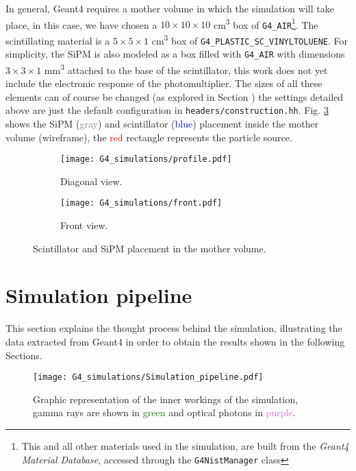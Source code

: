 In general, Geant4 requires a mother volume in which the simulation will take place, in this case, we have chosen a $10\times10\times10$ \unit{\cm\cubed} box of \texttt{G4\_AIR}\footnote{This and all other materials used in the simulation, are built from the \textit{Geant4 Material Database}, accessed through the \texttt{G4NistManager} class}. The scintillating material is a $5\times5\times1$ \unit{\cm\cubed} box of \texttt{G4\_PLASTIC\_SC\_VINYLTOLUENE}. For simplicity, the SiPM is also modeled as a box filled with \texttt{G4\_AIR} with dimensions $3\times3\times1$ \unit{\mm\cubed} attached to the base of the scintillator, this work does not yet include the electronic response of the photomultiplier. The sizes of all these elements can of course be changed (as explored in Section ) the settings detailed above are just the default configuration in \texttt{headers/construction.hh}. Fig. \ref{fig:geometry} shows the SiPM (\textcolor{Gray}{gray}) and scintillator (\textcolor{blue}{blue}) placement inside the mother volume (wireframe), the \textcolor{red}{red} rectangle represents the particle source.

\begin{figure}[H]
  \centering
  \begin{subfigure}[t]{0.48\textwidth}
    \texttt{[image: G4\_simulations/profile.pdf]}
    \caption{\label{sfig:geometry_profile}Diagonal view.}
  \end{subfigure}
  \hfill
  \begin{subfigure}[t]{0.48\textwidth}
    \texttt{[image: G4\_simulations/front.pdf]}
    \caption{\label{sfig:geometry_front}Front view.}
  \end{subfigure}
  \caption{\label{fig:geometry}Scintillator and SiPM placement in the mother volume.}
\end{figure}

\section{Simulation pipeline}

This section explains the thought process behind the simulation, illustrating the data extracted from Geant4 in order to obtain the results shown in the following Sections.

\begin{figure}[H]
  \centering
    \texttt{[image: G4\_simulations/Simulation\_pipeline.pdf]}
  \caption{\label{fig:sim_pipeline}Graphic representation of the inner workings of the simulation, gamma rays are shown in \textcolor{green}{green} and optical photons in \textcolor{Orchid}{purple}.}
\end{figure}

